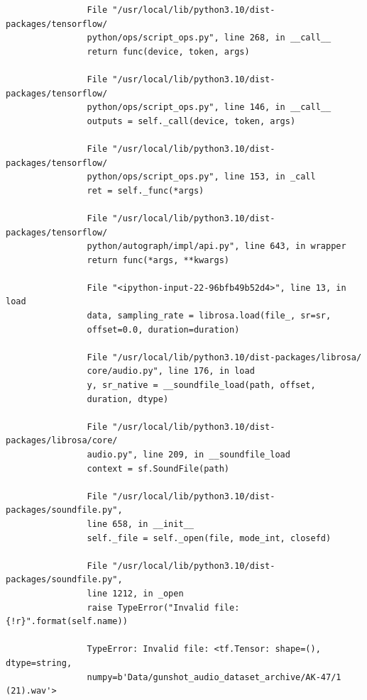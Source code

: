 \documentclass[12pt, a4paper]{article}
\begin{document}
\begin{verbatim}
				File "/usr/local/lib/python3.10/dist-packages/tensorflow/
				python/ops/script_ops.py", line 268, in __call__
				return func(device, token, args)
				
				File "/usr/local/lib/python3.10/dist-packages/tensorflow/
				python/ops/script_ops.py", line 146, in __call__
				outputs = self._call(device, token, args)
				
				File "/usr/local/lib/python3.10/dist-packages/tensorflow/
				python/ops/script_ops.py", line 153, in _call
				ret = self._func(*args)
				
				File "/usr/local/lib/python3.10/dist-packages/tensorflow/
				python/autograph/impl/api.py", line 643, in wrapper
				return func(*args, **kwargs)
				
				File "<ipython-input-22-96bfb49b52d4>", line 13, in load
				data, sampling_rate = librosa.load(file_, sr=sr, 
				offset=0.0, duration=duration)
				
				File "/usr/local/lib/python3.10/dist-packages/librosa/
				core/audio.py", line 176, in load
				y, sr_native = __soundfile_load(path, offset, 
				duration, dtype)
				
				File "/usr/local/lib/python3.10/dist-packages/librosa/core/
				audio.py", line 209, in __soundfile_load
				context = sf.SoundFile(path)
				
				File "/usr/local/lib/python3.10/dist-packages/soundfile.py",
				line 658, in __init__
				self._file = self._open(file, mode_int, closefd)
				
				File "/usr/local/lib/python3.10/dist-packages/soundfile.py",
				line 1212, in _open
				raise TypeError("Invalid file: {!r}".format(self.name))
				
				TypeError: Invalid file: <tf.Tensor: shape=(), dtype=string, 
				numpy=b'Data/gunshot_audio_dataset_archive/AK-47/1 (21).wav'>
				
			\end{verbatim}
			
			\newpage
			
\end{document}
